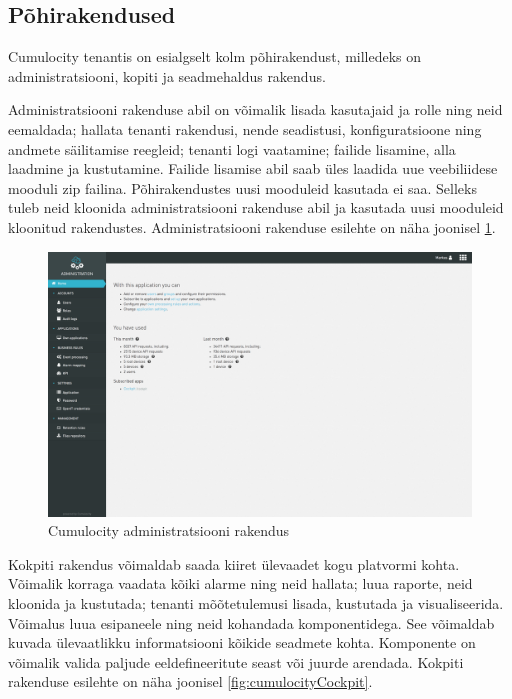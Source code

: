 \documentclass[12pt]{article}
\begin{document}
  
  \subsection{Põhirakendused}
    

  Cumulocity tenantis on esialgselt kolm põhirakendust, milledeks on
  administratsiooni, kopiti ja seadmehaldus rakendus.
  
  Administratsiooni rakenduse abil on võimalik lisada kasutajaid ja rolle
  ning neid eemaldada; hallata tenanti rakendusi, nende seadistusi,
  konfiguratsioone ning andmete säilitamise reegleid; tenanti logi vaatamine;
  failide lisamine, alla laadmine ja kustutamine. Failide lisamise abil saab
  üles laadida uue veebiliidese mooduli zip failina. Põhirakendustes uusi 
  mooduleid kasutada ei saa. Selleks tuleb neid kloonida administratsiooni rakenduse
  abil ja kasutada uusi mooduleid kloonitud rakendustes.
  Administratsiooni rakenduse esilehte on näha joonisel \ref{fig:cumulocityAdministration}.
  
  \begin{figure} [ht] %
  \begin{center}
  \includegraphics[width=1\textwidth]{cumulocityAdministration}
  \caption{Cumulocity administratsiooni rakendus}
  \label{fig:cumulocityAdministration}
  \end{center}
  \end{figure}

  \FloatBarrier

  Kokpiti rakendus võimaldab saada kiiret ülevaadet kogu platvormi kohta.
  Võimalik korraga vaadata kõiki alarme ning neid hallata; luua raporte,
  neid kloonida ja kustutada; tenanti mõõtetulemusi lisada, kustutada ja visualiseerida.
  Võimalus luua esipaneele ning neid kohandada komponentidega. See võimaldab kuvada
  ülevaatlikku informatsiooni kõikide seadmete kohta. Komponente on võimalik
  valida paljude eeldefineeritute seast või juurde arendada.
  Kokpiti rakenduse esilehte on näha joonisel \ref{fig:cumulocityCockpit}.
\end{document}
